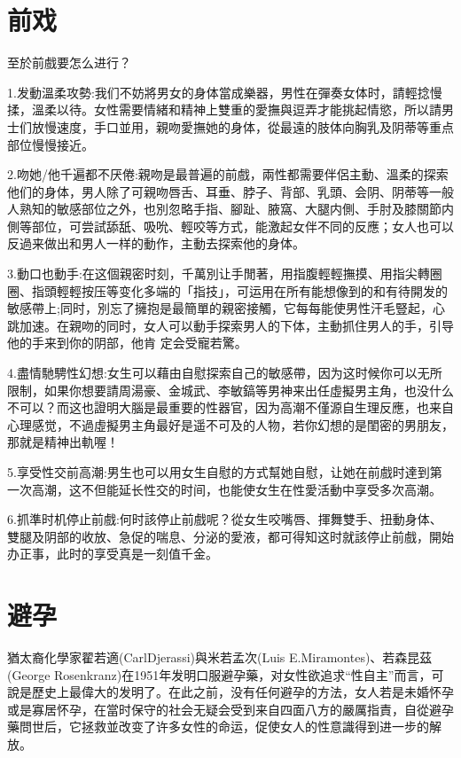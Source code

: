 \documentclass[12pt,UTF8]{ctexbook}
\begin{document}
\chapter{前戏}

至於前戲要怎么进行？

1.发動溫柔攻勢:我们不妨將男女的身体當成樂器，男性在彈奏女体时，請輕捻慢揉，溫柔以待。女性需要情緒和精神上雙重的愛撫與逗弄才能挑起情慾，所以請男士们放慢速度，手口並用，親吻愛撫她的身体，從最遠的肢体向胸乳及阴蒂等重点部位慢慢接近。

2.吻她/他千遍都不厌倦:親吻是最普遍的前戲，兩性都需要伴侶主動、溫柔的探索他们的身体，男人除了可親吻唇舌、耳垂、脖子、背部、乳頭、会阴、阴蒂等一般人熟知的敏感部位之外，也別忽略手指、腳趾、腋窩、大腿内側、手肘及膝關節内側等部位，可尝試舔舐、吸吮、輕咬等方式，能激起女伴不同的反應；女人也可以反過来做出和男人一样的動作，主動去探索他的身体。

3.動口也動手:在这個親密时刻，千萬別让手閒著，用指腹輕輕撫摸、用指尖轉圈圈、指頭輕輕按压等变化多端的「指技」，可运用在所有能想像到的和有待開发的敏感帶上;同时，別忘了擁抱是最簡單的親密接觸，它每每能使男性汗毛豎起，心跳加速。在親吻的同时，女人可以動手探索男人的下体，主動抓住男人的手，引导他的手来到你的阴部，他肯
定会受寵若驚。

4.盡情馳騁性幻想:女生可以藉由自慰探索自己的敏感帶，因为这时候你可以无所限制，如果你想要請周湯豪、金城武、李敏鎬等男神来出任虛擬男主角，也没什么不可以？而这也證明大腦是最重要的性器官，因为高潮不僅源自生理反應，也来自心理感觉，不過虛擬男主角最好是遥不可及的人物，若你幻想的是閨密的男朋友，那就是精神出軌喔！

5.享受性交前高潮:男生也可以用女生自慰的方式幫她自慰，让她在前戲时達到第一次高潮，这不但能延长性交的时间，也能使女生在性愛活動中享受多次高潮。

6.抓準时机停止前戲:何时該停止前戲呢？從女生咬嘴唇、揮舞雙手、扭動身体、雙腿及阴部的收放、急促的喘息、分泌的愛液，都可得知这时就該停止前戲，開始办正事，此时的享受真是一刻值千金。

\chapter{避孕}

猶太裔化學家翟若適(CarlDjerassi)與米若孟次(Luis E.Miramontes)、若森昆茲(George Rosenkranz)在1951年发明口服避孕藥，对女性欲追求“性自主”而言，可說是歷史上最偉大的发明了。在此之前，没有任何避孕的方法，女人若是未婚怀孕或是寡居怀孕，在當时保守的社会无疑会受到来自四面八方的嚴厲指責，自從避孕藥問世后，它拯救並改变了许多女性的命运，促使女人的性意識得到进一步的解放。
\end{document}
